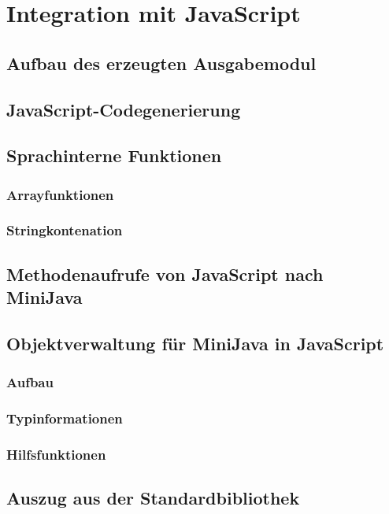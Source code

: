 \chapter{Integration mit JavaScript}

\section{Aufbau des erzeugten Ausgabemodul}

\section{JavaScript-Codegenerierung}

\section{Sprachinterne Funktionen}
\subsection{Arrayfunktionen}
\subsection{Stringkontenation}

\section{Methodenaufrufe von JavaScript nach MiniJava}

\section{Objektverwaltung für MiniJava in JavaScript}
\subsection{Aufbau}
\subsection{Typinformationen}
\subsection{Hilfsfunktionen}

\section{Auszug aus der Standardbibliothek}
